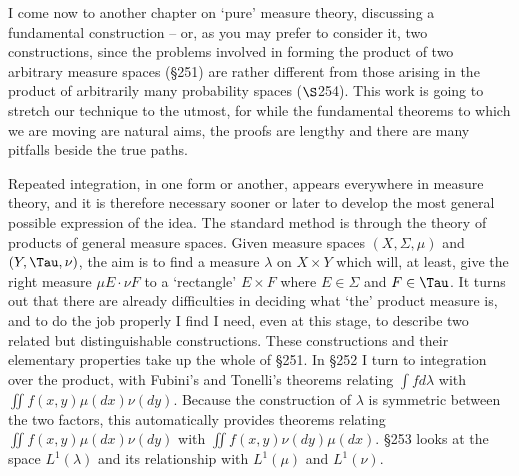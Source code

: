 
\def\chaptername{Product Measures}
\def\chaptername{Product measures}

I come now to another chapter on `pure' measure theory, discussing a
fundamental construction -- or, as you may prefer to consider it, two
constructions, since the problems involved in forming the product of
two arbitrary measure spaces (\S251) are rather different
from those arising in the product of arbitrarily many probability spaces
($\S$254).   This work is going to stretch our technique to the utmost,
for while the fundamental theorems to which we are moving are natural
aims, the proofs are lengthy and there are many
pitfalls beside the true paths.


Repeated integration, in one form or another, appears everywhere in
measure theory, and it is therefore necessary sooner or later to develop
the most general possible expression of the idea.   The standard method
is through the theory of products of general measure spaces.   Given
measure spaces $(X,\Sigma,\mu)$ and $(Y,\Tau,\nu)$, the aim is to find a
measure $\lambda$ on $X\times Y$ which will, at least, give the right
measure $\mu E\cdot\nu F$ to a `rectangle' $E\times F$ where
$E\in\Sigma$
and $F\in\Tau$.   It turns out that there are already difficulties in
deciding what `the' product measure is, and to do the job properly I
find I need, even at this stage, to describe two related but
distinguishable constructions.   These constructions and their
elementary properties take up the whole of \S251.   In \S252 I turn to
integration over the product, with Fubini's and Tonelli's theorems
relating $\int fd\lambda$ with $\iint f(x,y)\mu(dx)\nu(dy)$.   Because
the construction of $\lambda$ is symmetric between the two factors, this
automatically provides theorems relating $\iint f(x,y)\mu(dx)\nu(dy)$
with $\iint f(x,y)\nu(dy)\mu(dx)$.   \S253 looks at the space
$L^1(\lambda)$ and its relationship with $L^1(\mu)$ and $L^1(\nu)$.

